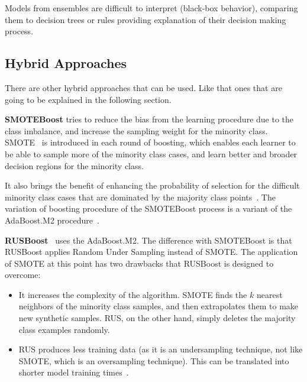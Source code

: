Models from ensembles are difficult to interpret (black-box behavior), 
comparing them to decision trees or rules providing explanation of their 
decision making process.

\subsection{Hybrid Approaches}\label{subsec:hybridApproaches}

There are other hybrid approaches that can be used. Like that ones that
are going to be explained in the following section.


\textbf{SMOTEBoost} tries to reduce the bias from the learning procedure due to 
the class imbalance, and increase the sampling weight for the minority class. 
SMOTE~\cite{CBHK2002} is introduced in each round of boosting, which enables 
each learner to be able to sample more of the minority class cases, and learn 
better and broader decision regions for the minority class. 

It also brings the benefit of enhancing the probability of selection for 
the difficult minority class cases that are dominated by the majority class 
points~\cite{CLHB2003}. The variation of boosting procedure of the SMOTEBoost 
process is a variant of the AdaBoost.M2 procedure~\cite{FS1997}.


\textbf{RUSBoost}~\cite{Seiffert2010} uses the AdaBoost.M2. The difference with 
SMOTEBoost is that RUSBoost applies Random Under Sampling instead of SMOTE. The 
application of SMOTE at this point has two drawbacks that 
RUSBoost is designed to overcome:

\begin{itemize}
    \item It increases the complexity of the algorithm. SMOTE finds the $k$ 
    nearest neighbors of the minority class samples, and then extrapolates
    them to make new synthetic samples. RUS, on the other hand, simply deletes 
	the majority class examples randomly.

    \item RUS produces less training data (as it is an undersampling 
    technique, not like SMOTE, which is an oversampling technique). This can
    be translated into shorter model training times~\cite{Seiffert2010}.
\end{itemize}

